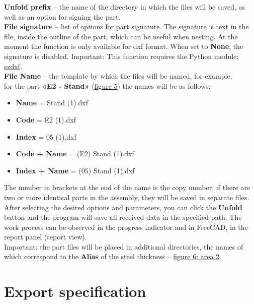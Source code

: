 \documentclass[a4paper,12pt]{article}
\begin{document}
\textbf{Unfold prefix} -- the name of the directory in which the files will be saved, as well as an option for signing the part.\\

\textbf{File signature} -- list of options for part signature. The signature is text in the file, inside the outline of the part, which can be useful when nesting. At the moment the function is only available for dxf format. When set to \textbf{None}, the signature is disabled. Important: This function requires the Python module: \href{https://pypi.org/project/ezdxf}{ezdxf}.\\

\textbf{File Name} -- the template by which the files will be named, for example,\\for the part \textbf{«E2 - Stand»} (\hyperref[sec:properties]{figure 5}) the names will be as follows:
\begin{itemize}
	\item \textbf{Name} = Stand (1).dxf
	\item \textbf{Code} = E2 (1).dxf
	\item \textbf{Index} = 05 (1).dxf
	\item \textbf{Code + Name} = (E2) Stand (1).dxf
	\item \textbf{Index + Name} = (05) Stand (1).dxf
\end{itemize}

The number in brackets at the end of the name is the copy number, if there are two or more identical parts in the assembly, they will be saved in separate files.\\

After selecting the desired options and parameters, you can click the \textbf{Unfold} button and the program will save all received data in the specified path. The work process can be observed in the progress indicator and in FreeCAD, in the report panel (report view).\\

Important: the part files will be placed in additional directories, the names of which correspond to the \textbf{Alias} of the steel thickness -- \hyperref[sec:pref_sm]{figure 6: area 2}.

\pagebreak




\section{Export specification}
\end{document}
